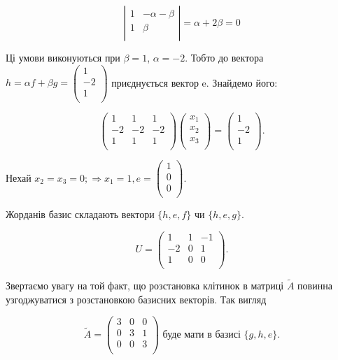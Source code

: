 $$\left| \begin{matrix}
	1 & - \alpha - \beta \\
	1 & \beta \\
\end{matrix} \right| = \alpha + 2\beta = 0 $$

Ці умови виконуються при $\beta = 1$, $\alpha = -2 $. Тобто до вектора
$h = \alpha f + \beta g = \begin{pmatrix}
	1 \\
	-2 \\
	1 \\
\end{pmatrix}$
приєднується вектор e. Знайдемо його: 

$$\begin{pmatrix}
	1  & 1  & 1  \\
	-2 & -2 & -2 \\
	1  & 1  & 1  \\
\end{pmatrix} \begin{pmatrix}
	x_1 \\
	x_2 \\
	x_3 \\
\end{pmatrix} = \begin{pmatrix}
	1  \\
	-2 \\
	1  \\
\end{pmatrix}. $$

Нехай $x_2 = x_3 = 0; \Rightarrow x_1 = 1, e = \begin{pmatrix}
	1 \\
	0 \\
	0 \\
\end{pmatrix}$.

Жорданів базис складають вектори $\{h, e, f\}$ чи $\{h, e, g\}$.

$$U = \begin{pmatrix}
	1  & 1 & -1 \\
	-2 & 0 & 1 \\
	1  & 0 & 0 \\
\end{pmatrix}.$$

Звертаємо увагу на той факт, що розстановка клітинок в матриці $\tilde{A}$ повинна
узгоджуватися з розстановкою базисних векторів. Так вигляд

$$\tilde{A} = \begin{pmatrix}
	3 & 0 & 0 \\
	0 & 3 & 1 \\
	0 & 0 & 3 \\
\end{pmatrix} \text{ буде мати в базисі } \{g, h, e\}. $$ 

